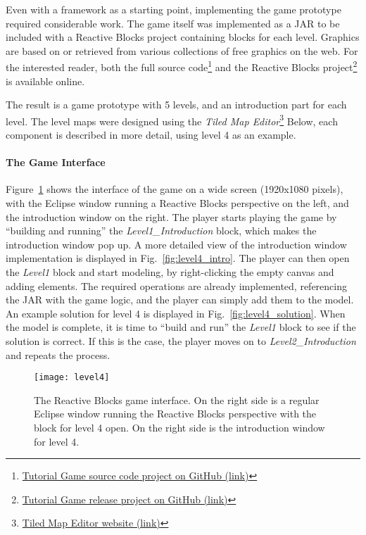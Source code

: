\noindent
Even with a framework as a starting point, implementing the game prototype required considerable work. The game itself was implemented as a JAR to be included with a Reactive Blocks project containing blocks for each level. Graphics are based on or retrieved from various collections of free graphics on the web. For the interested reader, both the full source code\footnote{\href{https://github.com/Desarc/reactive-blocks-tutorials/tree/master/no.ntnu.oyvinric.tutorialgame}{Tutorial Game source code project on GitHub (link)}} and the Reactive Blocks project\footnote{\href{https://github.com/Desarc/tutorial-game}{Tutorial Game release project on GitHub (link)}} is available online.

\noindent
The result is a game prototype with 5 levels, and an introduction part for each level. The level maps were designed using the \emph{Tiled Map Editor}\footnote{\href{http://www.mapeditor.org/}{Tiled Map Editor website (link)}} Below, each component is described in more detail, using level 4 as an example.

\paragraph{The Game Interface}
Figure~\ref{fig:level4} shows the interface of the game on a wide screen (1920x1080 pixels), with the Eclipse window running a Reactive Blocks perspective on the left, and the introduction window on the right. The player starts playing the game by ``building and running'' the \emph{Level1\_Introduction} block, which makes the introduction window pop up. A more detailed view of the introduction window implementation is displayed in Fig.~\ref{fig:level4_intro}. The player can then open the \emph{Level1} block and start modeling, by right-clicking the empty canvas and adding elements. The required operations are already implemented, referencing the JAR with the game logic, and the player can simply add them to the model. An example solution for level 4 is displayed in Fig.~\ref{fig:level4_solution}. When the model is complete, it is time to ``build and run'' the \emph{Level1} block to see if the solution is correct. If this is the case, the player moves on to \emph{Level2\_Introduction} and repeats the process.

\begin{figure}[htp]
	\centering
	\texttt{[image: level4]}
	\caption[The Reactive Blocks game interface]{The Reactive Blocks game interface. On the right side is a regular Eclipse window running the Reactive Blocks perspective with the block for level 4 open. On the right side is the introduction window for level 4.}
	\label{fig:level4}
\end{figure}

